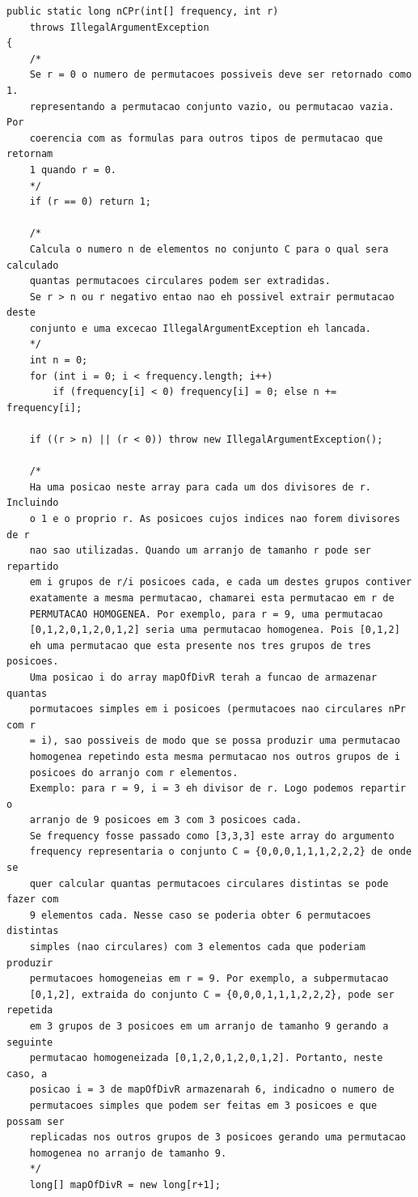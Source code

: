 \documentclass[a4paper,12pt,openany]{book}
\begin{document}
\begin{lstlisting}
public static long nCPr(int[] frequency, int r)
	throws IllegalArgumentException
{
	/*
	Se r = 0 o numero de permutacoes possiveis deve ser retornado como 1.
	representando a permutacao conjunto vazio, ou permutacao vazia. Por
	coerencia com as formulas para outros tipos de permutacao que retornam
	1 quando r = 0.
	*/
	if (r == 0) return 1;
	
	/*
	Calcula o numero n de elementos no conjunto C para o qual sera calculado
	quantas permutacoes circulares podem ser extradidas.
	Se r > n ou r negativo entao nao eh possivel extrair permutacao deste
	conjunto e uma excecao IllegalArgumentException eh lancada.
	*/
	int n = 0;
	for (int i = 0; i < frequency.length; i++)
		if (frequency[i] < 0) frequency[i] = 0; else n += frequency[i];
	
	if ((r > n) || (r < 0)) throw new IllegalArgumentException();
	
	/*
	Ha uma posicao neste array para cada um dos divisores de r. Incluindo
	o 1 e o proprio r. As posicoes cujos indices nao forem divisores de r
	nao sao utilizadas. Quando um arranjo de tamanho r pode ser repartido
	em i grupos de r/i posicoes cada, e cada um destes grupos contiver 
	exatamente a mesma permutacao, chamarei esta permutacao em r de 
	PERMUTACAO HOMOGENEA. Por exemplo, para r = 9, uma permutacao
	[0,1,2,0,1,2,0,1,2] seria uma permutacao homogenea. Pois [0,1,2]
	eh uma permutacao que esta presente nos tres grupos de tres posicoes.
	Uma posicao i do array mapOfDivR terah a funcao de armazenar quantas
	pormutacoes simples em i posicoes (permutacoes nao circulares nPr com r
	= i), sao possiveis de modo que se possa produzir uma permutacao
	homogenea repetindo esta mesma permutacao nos outros grupos de i
	posicoes do arranjo com r elementos.
	Exemplo: para r = 9, i = 3 eh divisor de r. Logo podemos repartir o 
	arranjo de 9 posicoes em 3 com 3 posicoes cada.
	Se frequency fosse passado como [3,3,3] este array do argumento 
	frequency representaria o conjunto C = {0,0,0,1,1,1,2,2,2} de onde se
	quer calcular quantas permutacoes circulares distintas se pode fazer com
	9 elementos cada. Nesse caso se poderia obter 6 permutacoes distintas
	simples (nao circulares) com 3 elementos cada que poderiam produzir
	permutacoes homogeneias em r = 9. Por exemplo, a subpermutacao 
	[0,1,2], extraida do conjunto C = {0,0,0,1,1,1,2,2,2}, pode ser repetida
	em 3 grupos de 3 posicoes em um arranjo de tamanho 9 gerando a seguinte
	permutacao homogeneizada [0,1,2,0,1,2,0,1,2]. Portanto, neste caso, a
	posicao i = 3 de mapOfDivR armazenarah 6, indicadno o numero de
	permutacoes simples que podem ser feitas em 3 posicoes e que possam ser
	replicadas nos outros grupos de 3 posicoes gerando uma permutacao 
	homogenea no arranjo de tamanho 9.
	*/
	long[] mapOfDivR = new long[r+1];
	

\end{lstlisting}
\end{document}
